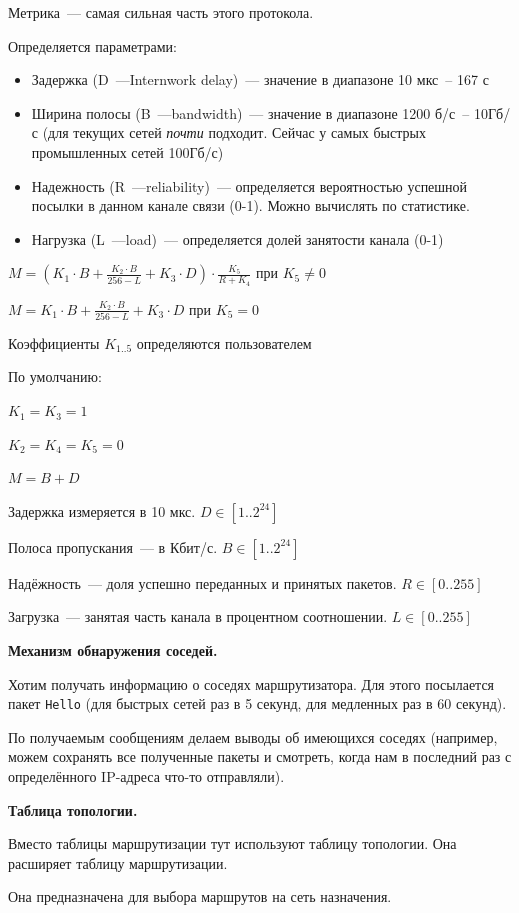 Метрика~--- самая сильная часть этого протокола.

Определяется параметрами:
\begin{itemize}
    \item Задержка (D~---Internwork delay)~--- значение в диапазоне 10 мкс~-- 167 с
    \item Ширина полосы (B~---bandwidth)~--- значение в диапазоне 1200 б/с~-- 10Гб/с (для текущих сетей {\it почти} подходит. Сейчас у самых быстрых промышленных сетей 100Гб/с)
    \item Надежность (R~---reliability)~--- определяется вероятностью успешной посылки в данном канале связи (0-1). Можно вычислять по статистике.
    \item Нагрузка (L~---load)~--- определяется долей занятости канала (0-1)
\end{itemize}

$M=(K_1\cdot B + \frac{K_2\cdot B}{256-L} + K_3\cdot D)\cdot\frac{K_5}{R+K_4}$ при $K_5\neq 0$

$M=K_1\cdot B + \frac{K_2\cdot B}{256-L} + K_3\cdot D$ при $K_5= 0$

Коэффициенты $K_{1..5}$ определяются пользователем

По умолчанию:

$K_1=K_3=1$

$K_2=K_4=K_5=0$

$M=B+D$

Задержка измеряется в 10 мкс. $D\in[1..2^{24}]$

Полоса пропускания~--- в Кбит/с. $B\in[1..2^{24}]$

Надёжность~--- доля успешно переданных и принятых пакетов. $R\in[0..255]$

Загрузка~--- занятая часть канала в процентном соотношении. $L\in[0..255]$

{\bf Механизм обнаружения соседей.}

Хотим получать информацию о соседях маршрутизатора. Для этого посылается пакет {\tt Hello} (для быстрых сетей раз в 5 секунд, для медленных раз в 60 секунд).

По получаемым сообщениям делаем выводы об имеющихся соседях (например, можем сохранять все полученные пакеты и смотреть, когда нам в последний раз с определённого IP-адреса что-то отправляли).

{\bf Таблица топологии.}

Вместо таблицы маршрутизации тут используют таблицу топологии. Она расширяет таблицу маршрутизации.

Она предназначена для выбора маршрутов на сеть назначения.

